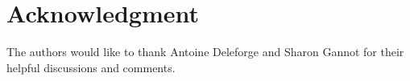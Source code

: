 \documentclass[journal]{IEEEtran}
\begin{document}

%


\section*{Acknowledgment}

The authors would like to thank Antoine Deleforge and Sharon Gannot for their helpful discussions and comments.


  \newpage







%


\end{document}

